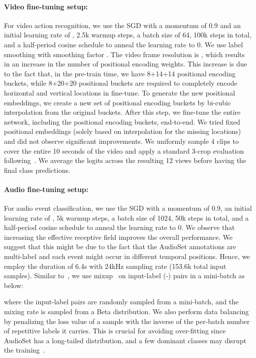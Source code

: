 \documentclass[10pt,twocolumn,letterpaper]{article}
\begin{document}
\paragraph{Video fine-tuning setup:} 
For video action recognition, we use the SGD with a momentum of 0.9 and an initial learning rate of , 2.5k warmup steps, a batch size of 64, 100k steps in total, and a half-period cosine schedule to anneal the learning rate to 0. We use label smoothing with smoothing factor . The video frame resolution is , which results in an increase in the number of positional encoding weights. This increase is due to the fact that, in the pre-train time, we have 8+14+14 positional encoding buckets, while 8+20+20 positional buckets are required to completely encode  horizontal and  vertical locations in fine-tune. To generate the new positional embeddings, we create a new set of positional encoding buckets by bi-cubic interpolation from the original buckets. After this step, we fine-tune the entire network, including the positional encoding buckets, end-to-end. We tried fixed positional embeddings (solely based on interpolation for the missing locations) and did not observe significant improvements. We uniformly sample 4 clips to cover the entire 10 seconds of the video and apply a standard 3-crop evaluation following~\cite{slowfast}. We average the logits across the resulting 12 views before having the final class predictions.


\paragraph{Audio fine-tuning setup:} 
For audio event classification, we use the SGD with a momentum of 0.9, an initial learning rate of , 5k warmup steps, a batch size of 1024, 50k steps in total, and a half-period cosine schedule to anneal the learning rate to 0. We observe that increasing the effective receptive field improves the overall performance. We suggest that this might be due to the fact that the AudioSet annotations are multi-label and each event might occur in different temporal positions. Hence, we employ the duration of 6.4s with 24kHz sampling rate (153.6k total input samples). Similar to~\cite{kong2020panns}, we use mixup~\cite{zhang2017mixup} on input-label (-) pairs in a mini-batch as below:

where the input-label pairs are randomly sampled from a mini-batch, and the mixing rate  is sampled from a Beta distribution. We also perform data balancing by penalizing the loss value of a sample with the inverse of the per-batch number of repetitive labels it carries. This is crucial for avoiding over-fitting since AudioSet has a long-tailed distribution, and a few dominant classes may disrupt the training~\cite{kong2020panns}.
\end{document}
